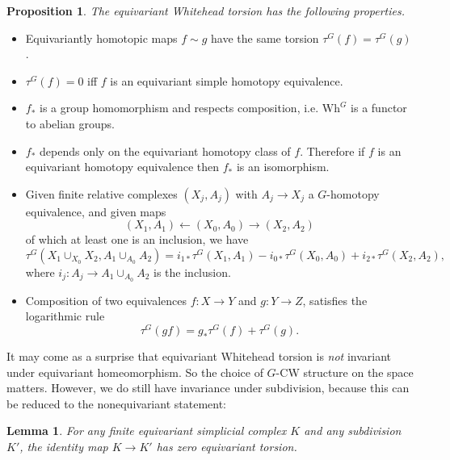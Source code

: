\documentclass[11pt]{amsart}
\newtheorem{prop}{Proposition}[section]
\newtheorem{lem}{Lemma}[section]
\theoremstyle{definition}
\numberwithin{equation}{section}
\numberwithin{figure}{section}
\newcommand{\Wh}{\mathrm{Wh}}
\begin{document}
	\begin{prop}\cite[Thm 4.8]{luck}\label{equiv_torsion_properties} The equivariant Whitehead torsion has the following properties.
	\end{prop}
	\begin{itemize}
		\item Equivariantly homotopic maps $f \sim g$ have the same torsion $\tau^G(f) = \tau^G(g)$.
		\item $\tau^G(f) = 0$ iff $f$ is an equivariant simple homotopy equivalence.
		\item $f_*$ is a group homomorphism and respects composition, i.e. $\Wh^G$ is a functor to abelian groups.
		\item $f_*$ depends only on the equivariant homotopy class of $f$. Therefore if $f$ is an equivariant homotopy equivalence then  $f_*$ is an isomorphism.
		\item Given finite relative complexes $(X_j,A_j)$ with $A_j\to X_j$ a $G$-homotopy equivalence, and given maps
		\[ (X_1,A_1) \longleftarrow (X_0,A_0) \longrightarrow (X_2,A_2) \]
		of which at least one is an inclusion, we have
		 \[\tau^G(X_1 \cup_{X_0} X_2,A_1 \cup_{A_0} A_2) = i_{1\ast}\tau^G(X_1,A_1) - i_{0\ast}\tau^G(X_0,A_0)  + i_{2\ast}\tau^G(X_2,A_2), \]
		where $ i_j:A_j\to A_1\cup_{A_0}A_2$ is the inclusion.
		\item Composition of two equivalences $f\colon X \to Y$ and $g\colon Y \to Z$, satisfies the logarithmic rule
		\[ \tau^G(gf) = g_*\tau^G(f) + \tau^G(g). \]
	\end{itemize}
	

It may come as a surprise that equivariant Whitehead torsion is \emph{not} invariant under equivariant homeomorphism. So the choice of $G$-CW structure on the space matters. However, we do still have invariance under subdivision, because this can be reduced to the nonequivariant statement:

	\begin{lem}\label{torsion_subdivision}
		For any finite equivariant simplicial complex $K$ and any subdivision $K'$, the identity map $K \to K'$ has zero equivariant torsion.
	\end{lem}
	
\end{document}
